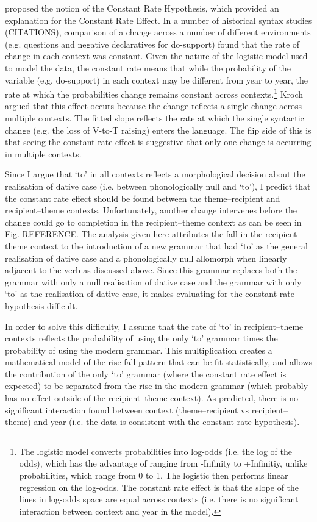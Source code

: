 \documentclass[11pt]{upenndiss}
\begin{document}
\cite{Kroch.1989} proposed the notion of the Constant Rate Hypothesis, which provided an explanation for the Constant Rate Effect. In a number of historical syntax studies (CITATIONS), comparison of a change across a number of different environments (e.g. questions and negative declaratives for do-support) found that the rate of change in each context was constant. Given the nature of the logistic model used to model the data, the constant rate means that while the probability of the variable (e.g. do-support) in each context may be different from year to year, the rate at which the probabilities change remains constant across contexts.\footnote{The logistic model converts probabilities into log-odds (i.e. the log of the odds), which has the advantage of ranging from -Infinity to +Infinitiy, unlike probabilities, which range from 0 to 1. The logistic then performs linear regression on the log-odds. The constant rate effect is that the slope of the lines in log-odds space are equal across contexts (i.e. there is no significant interaction between context and year in the model).} Kroch argued that this effect occurs because the change reflects a single change across multiple contexts. The fitted slope reflects the rate at which the single syntactic change (e.g. the loss of V-to-T raising) enters the language. The flip side of this is that seeing the constant rate effect is suggestive that only one change is occurring in multiple contexts.

Since I argue that `to' in all contexts reflects a morphological decision about the realisation of dative case (i.e. between phonologically null and `to'), I predict that the constant rate effect should be found between the theme--recipient and recipient--theme contexts. Unfortunately, another change intervenes before the change could go to completion in the recipient--theme context as can be seen in Fig. REFERENCE. The analysis given here attributes the fall in the recipient--theme context to the introduction of a new grammar that had `to' as the general realisation of dative case and a phonologically null allomorph when linearly adjacent to the verb as discussed above. Since this grammar replaces both the grammar with only a null realisation of dative case and the grammar with only `to' as the realisation of dative case, it makes evaluating for the constant rate hypothesis difficult.

In order to solve this difficulty, I assume that the rate of `to' in recipient--theme contexts reflects the probability of using the only `to' grammar times the probability of using the modern grammar. This multiplication creates a mathematical model of the rise fall pattern that can be fit statistically, and allows the contribution of the only `to' grammar (where the constant rate effect is expected) to be separated from the rise in the modern grammar (which probably has no effect outside of the recipient--theme context). As predicted, there is no significant interaction found between context (theme--recipient vs recipient--theme) and year (i.e. the data is consistent with the constant rate hypothesis).
\end{document}
